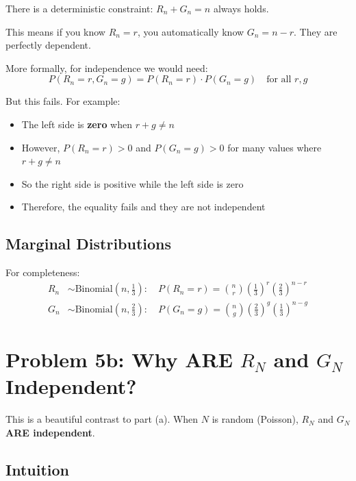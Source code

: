 \documentclass[12pt]{article}
\begin{document}
There is a deterministic constraint: $R_n + G_n = n$ always holds.

This means if you know $R_n = r$, you automatically know $G_n = n - r$. They are perfectly dependent.

More formally, for independence we would need:
\begin{equation*}
P(R_n = r, G_n = g) = P(R_n = r) \cdot P(G_n = g) \quad \text{for all } r, g
\end{equation*}

But this fails. For example:
\begin{itemize}[leftmargin=*]
    \item The left side is \textbf{zero} when $r + g \neq n$
    \item However, $P(R_n = r) > 0$ and $P(G_n = g) > 0$ for many values where $r + g \neq n$
    \item So the right side is positive while the left side is zero
    \item Therefore, the equality fails and they are not independent
\end{itemize}

\subsection*{Marginal Distributions}

For completeness:
\begin{align*}
R_n &\sim \text{Binomial}\left(n, \frac{1}{3}\right): \quad P(R_n = r) = \binom{n}{r} \left(\frac{1}{3}\right)^r \left(\frac{2}{3}\right)^{n-r}\\[5pt]
G_n &\sim \text{Binomial}\left(n, \frac{2}{3}\right): \quad P(G_n = g) = \binom{n}{g} \left(\frac{2}{3}\right)^g \left(\frac{1}{3}\right)^{n-g}
\end{align*}

\newpage

\section*{Problem 5b: Why ARE $R_N$ and $G_N$ Independent?}

This is a beautiful contrast to part (a). When $N$ is random (Poisson), $R_N$ and $G_N$ \textbf{ARE independent}.

\subsection*{Intuition}
\end{document}
